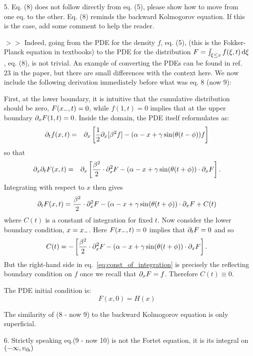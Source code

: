 \documentclass{article}
\begin{document}
\vskip10pt

\vskip 10pt 5. Eq. (8) does not follow directly from eq. (5), please show how to move
from one eq. to the other. Eq. (8) reminds the backward Kolmogorov
equation. If this is the case, add some comment to help the reader.

$>>$ Indeed, going from the PDE for the density $f$, eq. (5), (this is the Fokker-Planck
equation in textbooks) to the PDE for the distribution $F =  \int_{\xi \leq x} f
(\xi, t) \, \mathrm{d} \xi$, eq. (8), is not trivial. An example of converting the PDEs can be
found in ref. 23 in the paper, but there are small differences with the
context here.
We now include the following derivation immediately before what was eq. 8 (now
9):

First, at the lower boundary, it is intuitive that the cumulative distribution
should be zero, $ F({ x_{-} },t) = 0 $, while $f(1,t) = 0$ implies that at the upper boundary
$ {\partial}_xF(1, t) = 0 $. Inside the domain, the PDE itself reformulates as:
\begin{eqnarray*}
{\partial}_t f(x,t) &=&  {\partial}_x \left[\frac{1}{2}{\partial}_x [\beta^2 f] -  (\alpha - x + \gamma \sin({\theta}
(t - \phi)) f \right]
\end{eqnarray*}
so that
\begin{eqnarray*}
{\partial}_x {\partial}_t F(x,t) &=& {\partial}_x \left[
\frac{\beta^2 }{2}\cdot {\partial}^2_x F -
						(\alpha- x + \gamma \sin({\theta} (t + \phi))  \cdot {\partial}_xF \right].
\end{eqnarray*}
Integrating with respect to $x$ then gives
$$
{\partial}_t F(x,t) =
\frac{\beta^2 }{2}\cdot {\partial}^2_x F -
					(\alpha- x + \gamma \sin({\theta} (t + \phi))  \cdot {\partial}_xF + C(t)
$$
where $C(t)$ is a constant of integration for fixed $t$. Now consider
the lower boundary condition, $x =
{ x_{-} }$. Here $F({ x_{-} },t) = 0$ implies that ${\partial}_tF = 0$ and so
\begin{equation}
C(t) = - \left[ \frac{\beta^2 }{2}\cdot {\partial}^2_x F -
			(\alpha- x + \gamma \sin({\theta} (t + \phi))  \cdot {\partial}_xF \right].
\label{eq:const_of_integration}
\end{equation}
But the right-hand side in eq.\ \eqref{eq:const_of_integration} is precisely the
reflecting boundary condition on $f$ once we recall that ${\partial}_x F = f$. Therefore $C(t) \equiv 0$.

The PDE initial condition is: $$ F(x,0) = H(x) $$

The similarity of (8 - now 9) to the backward Kolmogorov equation is only
superficial.


\vskip 10pt 6. Strictly speaking eq.(9 - now 10) is not the Fortet equation, it
is its integral on $(-\infty, { v_{\textrm{th} } })$
\end{document}
